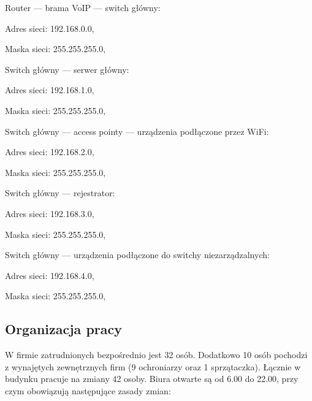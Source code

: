 \hspace{-0.5cm}\begin{minipage}{13.5cm}
\begin{itemize*}
	\item Router --- brama VoIP --- switch główny:
	\begin{itemize*}
		\item Adres sieci: 192.168.0.0,
		\item Maska sieci: 255.255.255.0,
	\end{itemize*}
	\item Switch główny --- serwer główny:
	\begin{itemize*}
		\item Adres sieci: 192.168.1.0,
		\item Maska sieci: 255.255.255.0,
	\end{itemize*}
	\item Switch główny --- access pointy --- urządzenia podłączone przez WiFi:
	\begin{itemize*}
		\item Adres sieci: 192.168.2.0,
		\item Maska sieci: 255.255.255.0,
	\end{itemize*}
	\item Switch główny --- rejestrator:
	\begin{itemize*}
		\item Adres sieci: 192.168.3.0,
		\item Maska sieci: 255.255.255.0,
	\end{itemize*}
	\item Switch główny --- urządzenia podłączone do switchy niezarządzalnych:
	\begin{itemize*}
		\item Adres sieci: 192.168.4.0,
		\item Maska sieci: 255.255.255.0,
	\end{itemize*}
\end{itemize*}
\end{minipage}

\newpage
\subsection{Organizacja pracy}
W firmie zatrudnionych bezpośrednio jest 32 osób. Dodatkowo 10 osób pochodzi z wynajętych zewnętrznych firm (9 ochroniarzy oraz 1 sprzątaczka). Łącznie w budynku pracuje na zmiany 42 osoby. Biura otwarte są od 6.00 do 22.00, przy czym obowiązują następujące zasady zmian:

